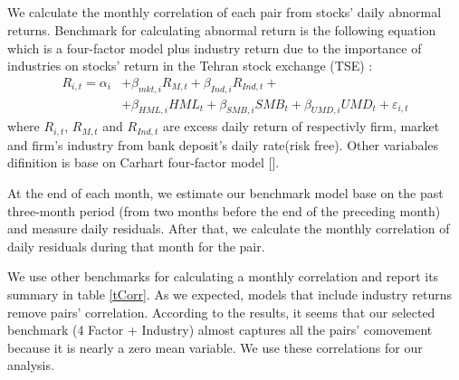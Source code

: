 \subsection{}
\label{comovement}
\begin{LTR}
	We calculate the monthly correlation of each pair from stocks' daily abnormal returns. Benchmark for calculating abnormal return is the following equation which is a four-factor model plus industry return due to the importance of industries on stocks' return in the Tehran stock exchange (TSE) :
	\begin{equation}
		\begin{split}
			R_{i,t} =\alpha _{i}&+\beta _{mkt,i}{\mathit {R}}_{M,t} + \beta_{Ind,i}{\mathit {R}}_{Ind,t} + \\
			&+\beta _{HML,i}{\mathit {HML}}_{t}+\beta _{SMB,i}{\mathit {SMB}}_{t}+\beta _{UMD,i}{\mathit {UMD}}_{t}+ \varepsilon_{i,t}
		\end{split}
		\label{e5Factor}
	\end{equation}
	where $ R_{i,t} $, $ R_{M,t} $ and $ R_{Ind,t} $ are excess daily return of respectivly  firm, market and firm's industry from bank deposit's daily rate(risk free). Other variabales difinition is base on Carhart four-factor model [\cite{Carhart4Factor}].
	
	At the end of each month, we estimate our benchmark model base on the past three-month period (from two months before the end of the preceding month) and measure daily residuals.  After that, we calculate the monthly correlation of daily residuals during that month for the pair.
	
	We use other benchmarks for calculating a monthly correlation and report its summary in table \ref{tCorr}. 
	As we expected,  models that include industry returns remove pairs' correlation. According to the results, it seems that our selected benchmark (4 Factor + Industry) almost captures all the pairs' comovement because it is nearly a zero mean variable. We use these correlations for our analysis.
	
	
\end{LTR}
